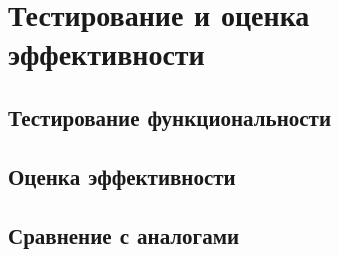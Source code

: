 \section{Тестирование и оценка эффективности}

\subsection{Тестирование функциональности}
\subsection{Оценка эффективности}
\subsection{Сравнение с аналогами}

\newpage
